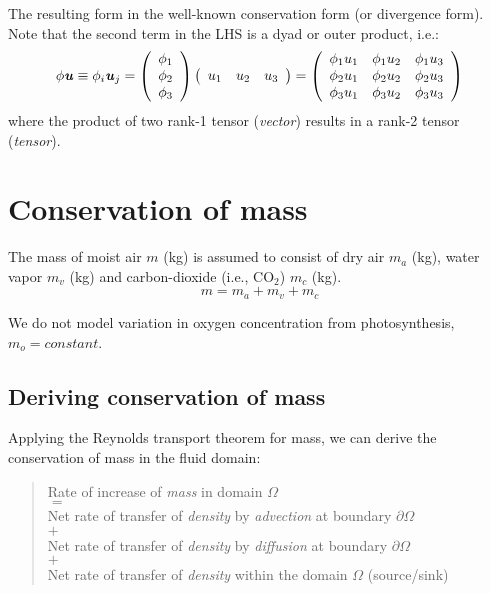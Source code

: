 The resulting form in the well-known conservation form (or divergence form). Note that the second term in the LHS is a dyad or outer product, i.e.:
\begin{equation}
\phi {\mvec{u}} \equiv {\phi _i}{\mvec{u}_j} = \left( {\begin{array}{*{20}{c}}
{{\phi _1}}\\
{{\phi _2}}\\
{{\phi _3}}
\end{array}} \right)\left( {\begin{array}{*{20}{c}}
{{u_1}}&{{u_2}}&{{u_3}}
\end{array}} \right) = \left( {\begin{array}{*{20}{c}}
{{\phi _1}{u_1}}&{{\phi _1}{u_2}}&{{\phi _1}{u_3}}\\
{{\phi _2}{u_1}}&{{\phi _2}{u_2}}&{{\phi _2}{u_3}}\\
{{\phi _3}{u_1}}&{{\phi _3}{u_2}}&{{\phi _3}{u_3}}
\end{array}} \right)
\end{equation}
where the product of two rank-1 tensor (\textit{vector}) results in a rank-2 tensor (\textit{tensor}).

\newpage

\section{Conservation of mass}
\label{sec:conservationofmass}

The mass of moist air $m$ (kg) is assumed to consist of dry air $m_a$ (kg), water vapor $m_v$ (kg) and carbon-dioxide (i.e., CO$_2$) $m_{c}$ (kg).
\begin{equation}
m = m_a + m_v + m_{c}
\end{equation}

\begin{assumption}
	We do not model variation in oxygen concentration from photosynthesis, $m_o = \textit{constant}$.
\end{assumption}

\subsection{Deriving conservation of mass}

Applying the Reynolds transport theorem for mass, we can derive the conservation of mass in the fluid domain:
\begin{quote}
	\centering
	Rate of increase of \textit{mass} in domain $\Omega$\\
	$=$\\
	Net rate of transfer of \textit{density} by \textit{advection} at boundary $\partial \Omega$\\
	$+$ \\
	Net rate of transfer of \textit{density} by \textit{diffusion} at boundary $\partial \Omega$\\
	$+$\\
	Net rate of transfer of \textit{density} within the domain $\Omega$ (source/sink)
\end{quote}

